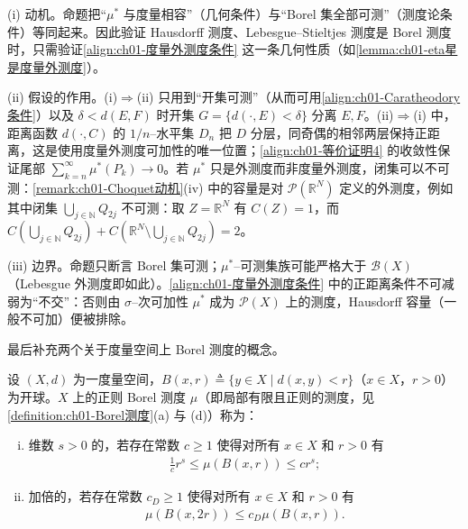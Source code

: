 \documentclass[../../main.tex]{subfiles}%
\begin{document}
\begin{remark}\label{remark:ch01-度量外测度等价动机}
(i) 动机。命题把“$\mu^*$ 与度量相容”（几何条件）与“Borel 集全部可测”（测度论条件）等同起来。因此验证 Hausdorff 测度、Lebesgue--Stieltjes 测度是 Borel 测度时，只需验证\eqref{align:ch01-度量外测度条件} 这一条几何性质（如\cref{lemma:ch01-eta星是度量外测度}）。

(ii) 假设的作用。(i)$\Rightarrow$(ii) 只用到“开集可测”（从而可用\eqref{align:ch01-Caratheodory条件}）以及 $\delta<d(E,F)$ 时开集 $G=\{d(\cdot,E)<\delta\}$ 分离 $E,F$。(ii)$\Rightarrow$(i) 中，距离函数 $d(\cdot,C)$ 的 $1/n$--水平集 $D_n$ 把 $D$ 分层，同奇偶的相邻两层保持正距离，这是使用度量外测度可加性的唯一位置；\eqref{align:ch01-等价证明4} 的收敛性保证尾部 $\sum_{k=n}^\infty\mu^*(P_k)\to0$。若 $\mu^*$ 只是外测度而非度量外测度，闭集可以不可测：\cref{remark:ch01-Choquet动机}(iv) 中的容量是对 $\mathcal{P}(\mathbb{R}^N)$ 定义的外测度，例如其中闭集 $\bigcup_{j\in\mathbb{N}}Q_{2j}$ 不可测：取 $Z=\mathbb{R}^N$ 有 $C(Z)=1$，而 $C\left(\bigcup_{j\in\mathbb{N}}Q_{2j}\right)+C\left(\mathbb{R}^N\setminus\bigcup_{j\in\mathbb{N}}Q_{2j}\right)=2$。

(iii) 边界。命题只断言 Borel 集可测；$\mu^*$--可测集族可能严格大于 $\mathcal{B}(X)$（Lebesgue 外测度即如此）。\eqref{align:ch01-度量外测度条件} 中的正距离条件不可减弱为“不交”：否则由 $\sigma$--次可加性 $\mu^*$ 成为 $\mathcal{P}(X)$ 上的测度，Hausdorff 容量（一般不可加）便被排除。
\end{remark}

最后补充两个关于度量空间上 Borel 测度的概念。

\begin{definition}[维数与加倍测度]\label{definition:ch01-加倍测度}
设 $(X,d)$ 为一度量空间，$B(x,r)\triangleq\{y\in X\mid d(x,y)<r\}$（$x\in X$，$r>0$）为开球。$X$ 上的正则 Borel 测度 $\mu$（即局部有限且正则的测度，见\cref{definition:ch01-Borel测度}(a) 与 (d)）称为：
\begin{enumerate}[(i)]
\item 维数 $s>0$ 的，若存在常数 $c\geqslant1$ 使得对所有 $x\in X$ 和 $r>0$ 有
\begin{align}
\frac{1}{c}r^s\leqslant\mu(B(x,r))\leqslant cr^s; \label{align:ch01-维数条件}
\end{align}
\item 加倍的，若存在常数 $c_D\geqslant1$ 使得对所有 $x\in X$ 和 $r>0$ 有
\begin{align}
\mu(B(x,2r))\leqslant c_D\mu(B(x,r)). \label{align:ch01-加倍条件}
\end{align}
\end{enumerate}
\end{definition}
\end{document}

